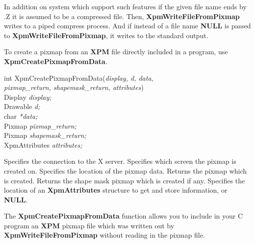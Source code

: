 In addition on system which support such features if the given file name ends
by .Z it is assumed to be a compressed file. Then, {\bf XpmWriteFileFromPixmap}
writes to a piped compress process. And if instead of a file name {\bf NULL}
is passed to {\bf XpmWriteFileFromPixmap}, it writes to the standard output.

\vspace{.5cm}
To create a pixmap from an {\bf XPM} file directly included in a program, use
{\bf XpmCreatePixmapFromData}.

\begin{flushleft} 

int XpmCreatePixmapFromData({\it display, d, data, \\
\hspace{3cm}pixmap\_return, shapemask\_return, attributes})\\

\hspace{1cm}Display {\it *display;}\\
\hspace{1cm}Drawable {\it d;}\\
\hspace{1cm}char {\it **data;}\\
\hspace{1cm}Pixmap {\it *pixmap\_return;}\\
\hspace{1cm}Pixmap {\it *shapemask\_return;}\\
\hspace{1cm}XpmAttributes {\it *attributes;}

\end{flushleft}

\begin{description}

 Specifies the connection to the X server.
 Specifies which screen the pixmap is created on.
 Specifies the location of the pixmap data.
 Returns the pixmap which is created.
 Returns the shape mask pixmap which is created if
any.
 Specifies the location of an {\bf XpmAttributes} structure
to get and store information, or {\bf NULL}. 

\end{description} 

The {\bf XpmCreatePixmapFromData} function allows you to include in your C
program an {\bf XPM} pixmap file which was written out by {\bf
XpmWriteFileFromPixmap} without reading in the pixmap file.


